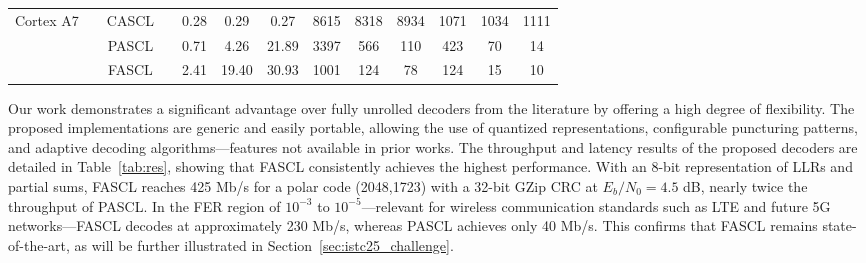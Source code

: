 \documentclass[11pt]{report}
\begin{document}
\begin{table}[h]
{{\begin{tabular}{r|c|c|c c c c| c c c| c c c}
        \hline
        \multirow{3}{*}{\begin{minipage}{0.5in}\centering Cortex A7\end{minipage}}   & \multirow{3}{*}{\begin{minipage}{0.5in}\centering 1400\end{minipage}}
                                                                                     & CASCL                                                                                 &                                            & 0.28 & 0.29                                                      & 0.27                                              & 8615                                                       & 8318         & 8934         & 1071         & 1034         & 1111                        \\
                                                                                     &                                                                                       & PASCL                                      &      & 0.71                                                      & 4.26                                              & 21.89                                                      & 3397         & 566          & 110          & 423          & 70           & 14           \\
                                                                                     &                                                                                       & FASCL                                      &      & 2.41                                                      & 19.40                                             & 30.93                                                      & 1001         & 124          & 78           & 124          & 15           & 10           \\
      \end{tabular}
    }}
\end{table}

Our work demonstrates a significant advantage over fully unrolled decoders from the literature by offering a high degree of flexibility. The proposed implementations are generic and easily portable, allowing the use of quantized representations, configurable puncturing patterns, and adaptive decoding algorithms—features not available in prior works. The throughput and latency results of the proposed decoders are detailed in Table~\ref{tab:res}, showing that FASCL consistently achieves the highest performance. With an 8-bit representation of LLRs and partial sums, FASCL reaches 425 Mb/s for a polar code (2048,1723) with a 32-bit GZip CRC at $E_b/N_0 = 4.5$ dB, nearly twice the throughput of PASCL. In the FER region of $10^{-3}$ to $10^{-5}$—relevant for wireless communication standards such as LTE and future 5G networks—FASCL decodes at approximately 230 Mb/s, whereas PASCL achieves only 40 Mb/s. This confirms that FASCL remains state-of-the-art, as will be further illustrated in Section~\ref{sec:istc25_challenge}.
\end{document}
